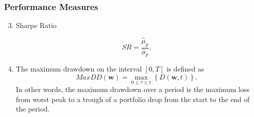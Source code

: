 \documentclass[pdf,10pt,xcolor=dvipsnames,hide notes]{beamer}
\begin{document}
\begin{frame}
	\frametitle{Performance Measures}
	
	\begin{enumerate}
		\setcounter{enumi}{2}
		
		\item Sharpe Ratio
		
		\begin{equation}
		SR=\frac{\widehat{\mu }_{p}}{\widehat{\sigma }_{p}}.
		\end{equation}
		
		\vspace{0.3cm}
		
			\item The maximum drawdown on the interval $[0,T]$ is defined as
		\begin{equation}
		MaxDD\left( \mathbf{w}\right) =\underset{0\leq \tau \leq t}{\max }\left\{
		D\left( \mathbf{w,}t\right) \right\} .
		\end{equation}
		In other words, the maximum drawdown over a period is the maximum loss from
		worst peak to a trough of a portfolio drop from the start to the end of the
		period.
		
		
	\end{enumerate}

%	
%	
	
\end{frame}
\end{document}
